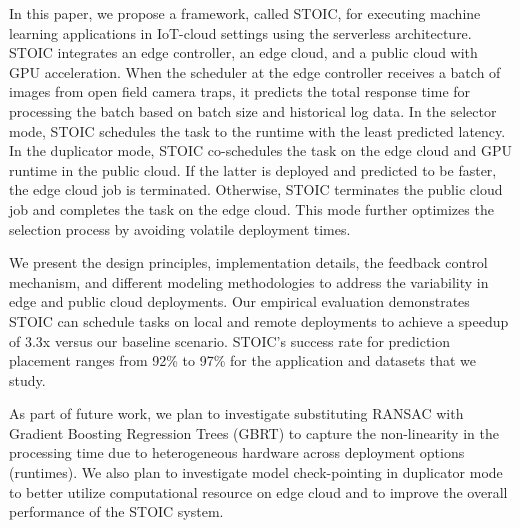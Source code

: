 In this paper, we propose a framework, called STOIC, for executing machine
learning applications in IoT-cloud settings using the serverless
architecture. STO\-IC integrates an edge controller, an edge cloud, and a public
cloud with GPU acceleration. When the scheduler at the edge controller
receives a batch of images from open field camera traps, it predicts the total
response time for processing the batch based on batch size and historical log
data. In the selector mode, STOIC schedules the task to the runtime with the
least predicted latency. In the duplicator mode, STOIC co-schedules the task
on the edge cloud and GPU runtime in the public cloud. If the latter is
deployed and predicted to be faster, the edge cloud job is terminated.
Otherwise, STOIC terminates the public cloud job and 
completes the task on the edge cloud.
This mode further optimizes the selection process by avoiding volatile
deployment times.

We present the design principles, implementation details, the feedback control
mechanism, and different modeling methodologies to address the variability in
edge and public cloud deployments. Our empirical evaluation demonstrates STOIC
can schedule tasks on local and remote deployments to achieve a speedup of
3.3x versus our baseline scenario. STOIC's success rate for prediction
placement  ranges from 92\% to 97\% for the application and datasets that we
study. 

As part of future work, we plan to investigate substituting RANSAC with
Gradient Boosting Regression Trees (GBRT) to capture the non-linearity in the
processing time due to heterogeneous hardware across deployment options
(runtimes). We also plan to investigate model check-pointing in duplicator
mode to better utilize computational resource on edge cloud and to improve the
overall performance of the STOIC system.
